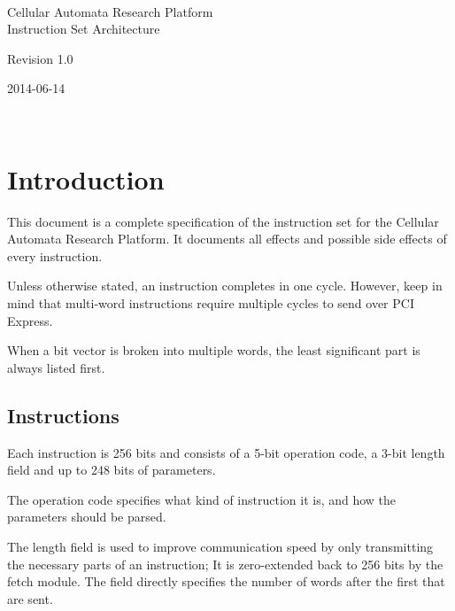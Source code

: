 \documentclass[a4paper,twoside,12pt]{article}
\begin{document}

\begin{titlepage}
\center

~

\vspace{2cm}

\huge
Cellular Automata Research Platform\\
Instruction Set Architecture

\vfill

\large
Revision 1.0

\large
2014-06-14

\vspace{2cm}

~

\end{titlepage}

\cleardoublepage

\pagestyle{fancy}

\tableofcontents

\cleardoublepage
{}

\section{Introduction}

This document is a complete specification of the instruction set for the Cellular Automata Research Platform.
It documents all effects and possible side effects of every instruction.

Unless otherwise stated, an instruction completes in one cycle.
However, keep in mind that multi-word instructions require multiple cycles to send over PCI Express.

When a bit vector is broken into multiple words, the least significant part is always listed first.

\clearpage
\subsection{Instructions}

Each instruction is 256 bits and consists of a 5-bit operation code, a 3-bit length field and up to 248 bits of parameters.

The operation code specifies what kind of instruction it is, and how the parameters should be parsed.

The length field is used to improve communication speed by only transmitting the necessary parts of an instruction;
It is zero-extended back to 256 bits by the fetch module.
The field directly specifies the number of words after the first that are sent.
\end{document}
